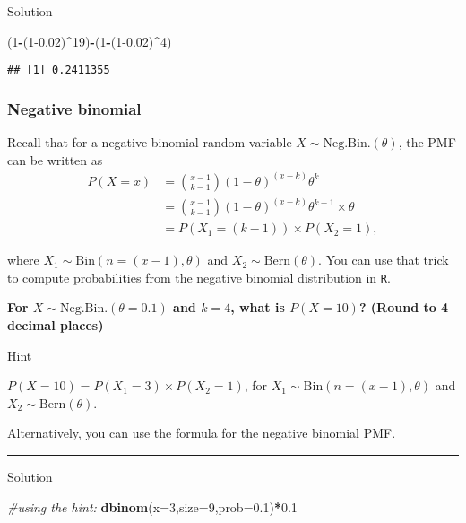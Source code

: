 \documentclass[
]{book}
\newenvironment{Shaded}{\begin{snugshade}}{\end{snugshade}}
\newcommand{\AttributeTok}[1]{\textcolor[rgb]{0.13,0.29,0.53}{#1}}
\newcommand{\CommentTok}[1]{\textcolor[rgb]{0.56,0.35,0.01}{\textit{#1}}}
\newcommand{\DecValTok}[1]{\textcolor[rgb]{0.00,0.00,0.81}{#1}}
\newcommand{\FloatTok}[1]{\textcolor[rgb]{0.00,0.00,0.81}{#1}}
\newcommand{\FunctionTok}[1]{\textcolor[rgb]{0.13,0.29,0.53}{\textbf{#1}}}
\newcommand{\NormalTok}[1]{#1}
\newcommand{\SpecialCharTok}[1]{\textcolor[rgb]{0.81,0.36,0.00}{\textbf{#1}}}
\begin{document}
Solution

\begin{Shaded}
\begin{Highlighting}[]
\NormalTok{(}\DecValTok{1}\SpecialCharTok{{-}}\NormalTok{(}\DecValTok{1}\FloatTok{{-}0.02}\NormalTok{)}\SpecialCharTok{\^{}}\DecValTok{19}\NormalTok{)}\SpecialCharTok{{-}}\NormalTok{(}\DecValTok{1}\SpecialCharTok{{-}}\NormalTok{(}\DecValTok{1}\FloatTok{{-}0.02}\NormalTok{)}\SpecialCharTok{\^{}}\DecValTok{4}\NormalTok{)}
\end{Highlighting}
\end{Shaded}

\begin{verbatim}
## [1] 0.2411355
\end{verbatim}

\hypertarget{negative-binomial}{%
\subsubsection{Negative binomial}\label{negative-binomial}}

Recall that for a negative binomial random variable \(X \sim \mbox{Neg.Bin.}(\theta)\), the PMF can be written as \begin{align*}
  P(X=x)&=\binom{x-1}{k-1}(1-\theta)^{(x-k)}\theta^{k}\\
  &=\binom{x-1}{k-1}(1-\theta)^{(x-k)}\theta^{k-1} \times \theta\\
  &=P(X_{1}=(k-1)) \times P(X_{2}=1),
\end{align*}

where \(X_{1} \sim \mbox{Bin}(n=(x-1),\theta)\) and \(X_{2} \sim \mbox{Bern}(\theta)\). You can use that trick to compute probabilities from the negative binomial distribution in \texttt{R}.

\textbf{For \(X \sim \mbox{Neg.Bin.}(\theta=0.1)\) and \(k=4\), what is \(P(X=10)\)? (Round to 4 decimal places)}

Hint

\(P(X=10)=P(X_{1}=3) \times P(X_{2}=1)\), for \(X_{1}\sim \mbox{Bin}(n=(x-1),\theta)\) and \(X_{2}\sim \mbox{Bern}(\theta)\).

Alternatively, you can use the formula for the negative binomial PMF.

\begin{center}\rule{0.5\linewidth}{0.5pt}\end{center}

Solution

\begin{Shaded}
\begin{Highlighting}[]
\CommentTok{\#using the hint:}
\FunctionTok{dbinom}\NormalTok{(}\AttributeTok{x=}\DecValTok{3}\NormalTok{,}\AttributeTok{size=}\DecValTok{9}\NormalTok{,}\AttributeTok{prob=}\FloatTok{0.1}\NormalTok{)}\SpecialCharTok{*}\FloatTok{0.1}
\end{Highlighting}
\end{Shaded}
\end{document}

